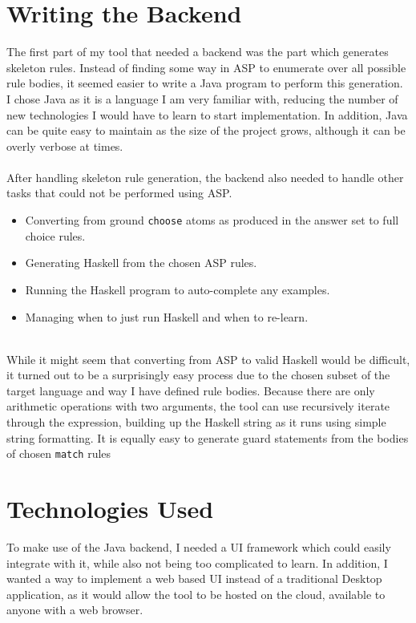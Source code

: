 \section{Writing the Backend}
The first part of my tool that needed a backend was the part which generates skeleton rules. Instead of finding some way in ASP to enumerate over all possible rule bodies, it seemed easier to write a Java program to perform this generation. I chose Java as it is a language I am very familiar with, reducing the number of new technologies I would have to learn to start implementation. In addition, Java can be quite easy to maintain as the size of the project grows, although it can be overly verbose at times. \\ \\
After handling skeleton rule generation, the backend also needed to handle other tasks that could not be performed using ASP.
\begin{itemize}
\item Converting from ground \lstinline{choose} atoms as produced in the answer set to full choice rules. %
\item Generating Haskell from the chosen ASP rules.
\item Running the Haskell program to auto-complete any examples.
\item Managing when to just run Haskell and when to re-learn.
\end{itemize} 
\mbox{} \\
While it might seem that converting from ASP to valid Haskell would be difficult, it turned out to be a surprisingly easy process due to the chosen subset of the target language and way I have defined rule bodies. Because there are only arithmetic operations with two arguments, the tool can use recursively iterate through the expression, building up the Haskell string as it runs using simple string formatting. It is equally easy to generate guard statements from the bodies of chosen \lstinline{match} rules %

\section{Technologies Used}
To make use of the Java backend, I needed a UI framework which could easily integrate with it, while also not being too complicated to learn. In addition, I wanted a way to implement a web based UI instead of a traditional Desktop application, as it would allow the tool to be hosted on the cloud, available to anyone with a web browser.

